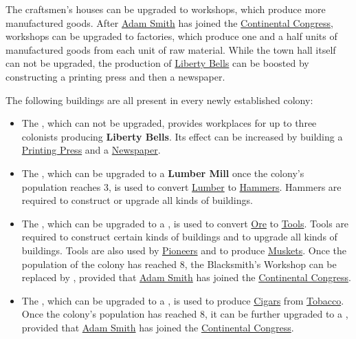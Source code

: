 \documentclass[12pt]{book}
\begin{document}
The craftsmen's houses can be upgraded to workshops, which produce
more manufactured goods. After \hyperlink{Adam Smith}{Adam Smith} has
joined the \hyperlink{Continental Congress}{Continental Congress},
workshops can be upgraded to factories, which produce one and a half
units of manufactured goods from each unit of raw material. While the
town hall itself can not be upgraded, the production of
\hyperlink{Liberty Bells}{Liberty Bells} can be boosted by
constructing a printing press and then a newspaper.

The following buildings are all present in every newly established
colony:

\begin{itemize}
\item The , which can not be upgraded, provides
  workplaces for up to three colonists producing \textbf{Liberty
  Bells}. Its effect can be increased by building a
  \hyperlink{Printing Press}{Printing Press} and a
  \hyperlink{Newspaper}{Newspaper}.

\item The , which can be upgraded to a
  \textbf{Lumber Mill} once the colony's population reaches 3, is used
  to convert \hyperlink{Lumber}{Lumber} to
  \hyperlink{Hammers}{Hammers}. Hammers are required to construct or
  upgrade all kinds of buildings.

\item The , which can be upgraded to a
  , is used to convert
  \hyperlink{Ore}{Ore} to \hyperlink{Tools}{Tools}. Tools are required
  to construct certain kinds of buildings and to upgrade all kinds of
  buildings. Tools are also used by \hyperlink{Pioneer}{Pioneers} and
  to produce \hyperlink{Muskets}{Muskets}. Once the population of the
  colony has reached 8, the Blacksmith's Workshop can be replaced by
  , provided that \hyperlink{Adam Smith}{Adam
  Smith} has joined the \hyperlink{Continental Congress}{Continental
  Congress}.

\item The , which can be upgraded to a
  , is used to produce
  \hyperlink{Cigars}{Cigars} from \hyperlink{Tobacco}{Tobacco}.  Once
  the colony's population has reached 8, it can be further upgraded to
  a , provided that \hyperlink{Adam
  Smith}{Adam Smith} has joined the \hyperlink{Continental
  Congress}{Continental Congress}.


\end{itemize}
\end{document}
